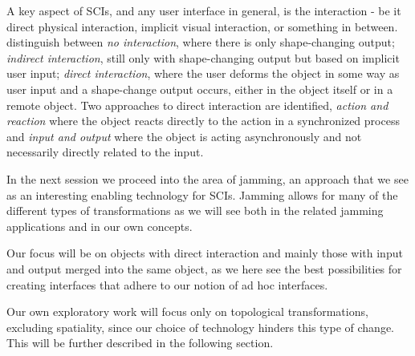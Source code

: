A key aspect of SCIs, and any user interface in general, is the interaction - be it direct physical interaction, implicit visual interaction, or something in between. 
\citeauthor{rasmussen2012shape} distinguish between \textit{no interaction}, where there is only shape-changing output; \textit{indirect interaction}, still only with shape-changing output but based on implicit user input; \textit{direct interaction}, where the user deforms the object in some way as user input and a shape-change output occurs, either in the object itself or in a remote object.
Two approaches to direct interaction are identified, \textit{action and reaction} where the object reacts directly to the action in a synchronized process and \textit{input and output} where the object is acting asynchronously and not necessarily directly related to the input.

In the next session we proceed into the area of jamming, an approach that we see as an interesting enabling technology for SCIs.
Jamming allows for many of the different types of transformations as we will see both in the related jamming applications and in our own concepts. 

Our focus will be on objects with direct interaction and mainly those with input and output merged into the same object, as we here see the best possibilities for creating interfaces that adhere to our notion of ad hoc interfaces.
 
Our own exploratory work will focus only on topological transformations, excluding spatiality, since our choice of technology hinders this type of change. This will be further described in the following section.